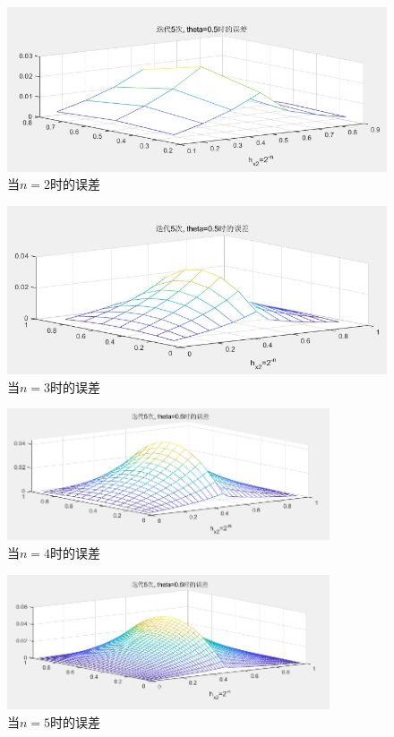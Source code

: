 \documentclass[12pt]{article}
\begin{document}
\begin{figure}[H]
	\centering
	\includegraphics[width=1\textwidth]{1}
	\caption{当$n=2$时的误差}
\end{figure}
\begin{figure}[H]
	\centering
	\includegraphics[width=1\textwidth]{2}
	\caption{当$n=3$时的误差}
\end{figure}
\begin{figure}[H]
	\centering
	\includegraphics[width=0.85\textwidth]{3}
	\caption{当$n=4$时的误差}
\end{figure}
\begin{figure}[H]
	\centering
	\includegraphics[width=0.85\textwidth]{4}
	\caption{当$n=5$时的误差}
\end{figure}
\end{document}
